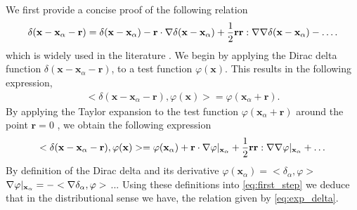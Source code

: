 We first provide a concise proof of the following relation
\begin{equation}
    \delta(\textbf{x} - \textbf{x}_\alpha - \textbf{r})
    = \delta(\textbf{x} - \textbf{x}_\alpha)
    - \textbf{r}\cdot\grad \delta(\textbf{x} - \textbf{x}_\alpha)
    + \frac{1}{2}\textbf{rr}:\grad\grad\delta(\textbf{x} - \textbf{x}_\alpha) 
    - \ldots.
    \label{eq:exp_delta}
    \end{equation}
 which is widely used in the literature \citep{zhang2023evolution}. 
We begin by applying the Dirac delta function $\delta(\textbf{x} - \textbf{x}_\alpha - \textbf{r})$, to a test function $\varphi(\textbf{x})$.
This results in the following expression,
\begin{align*}
    < \delta(\textbf{x} - \textbf{x}_\alpha - \textbf{r}), \varphi(\textbf{x})> 
    =
    \varphi(\textbf{x}_\alpha + \textbf{r}).  
\end{align*}
By applying the Taylor expansion to the test function $\varphi(\textbf{x}_\alpha + \textbf{r})$ around the point $\textbf{r} = 0$ , we obtain the following expression
\begin{equation}
    < \delta(\textbf{x} - \textbf{x}_\alpha - \textbf{r}), \varphi(\textbf{x})> 
    =
    \varphi(\textbf{x}_\alpha) 
    + \textbf{r} \cdot \grad \varphi|_{\textbf{x}_\alpha}
    + \frac{1}{2}\textbf{r}\textbf{r} : \grad\grad \varphi|_{\textbf{x}_\alpha}
    + \ldots
    \label{eq:first_step}
\end{equation}
By definition of the Dirac delta and its derivative \citep{appel2007}  %
$\varphi(\textbf{x}_\alpha) =  <\delta_\alpha, \varphi>$%
$\mathbf{\nabla}\varphi|_{\textbf{x}_\alpha} =  - <\mathbf{\nabla}\delta_\alpha, \varphi>$
$...$  
Using these definitions into \ref{eq:first_step} we deduce that in the distributional sense we have, 
the relation given by \ref{eq:exp_delta}. 

